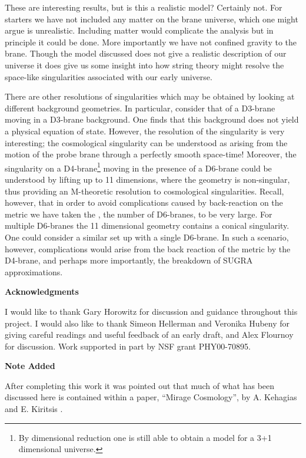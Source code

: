 \documentclass[a4paper,12pt]{article}
\begin{document}
These are interesting results, but is this a realistic model?
Certainly not.  For starters we have not included any matter on the
brane universe, which one might argue is unrealistic.  Including
matter would complicate the analysis but in
principle it could be done.  More importantly we have not confined
gravity to the brane.  Though the model discussed does not give a
realistic description of our
universe it does give us some insight into how string theory might
resolve the space-like singularities associated with our early universe.

There are other resolutions of singularities which may be obtained by looking at
different background geometries.
In particular, consider that of a D3-brane moving in a D3-brane background.
One finds that this background does not yield a physical equation
of state.  However, the resolution of the singularity is 
very interesting;   
the cosmological singularity can be understood as arising from the motion
of the probe brane through a perfectly smooth space-time!  
Moreover, the singularity on a D4-brane\footnote{By  dimensional
reduction one is still able to obtain a model for a 3+1 dimensional universe.}
moving in the presence of a D6-brane could be understood by lifting up to 11
dimensions, where the geometry is non-singular, thus providing an
M-theoretic resolution to cosmological
singularities.  Recall, however, that in order to avoid complications
caused by back-reaction on the metric we have taken the \coordHE{}, the number
of D6-branes, to be very large.  For multiple D6-branes the 11
dimensional geometry contains a
conical singularity.  One could consider a similar set up with a
single D6-brane.  In such a scenario, however, complications
would arise from the back reaction of the metric by the D4-brane,
and perhaps more importantly, the breakdown of SUGRA
approximations. 

\vskip 1.25cm \centerline{\bf Acknowledgments} \vskip 1cm

I would like to thank Gary Horowitz for discussion and guidance
throughout this project.  I would also like to thank Simeon Hellerman and
Veronika Hubeny for giving careful readings and useful feedback of an
early draft, and Alex Flournoy for discussion.
Work supported in part by NSF grant PHY00-70895.

\vskip 1.25cm \centerline{\bf \large Note Added \normalsize} 
\vskip 1cm

After completing this work it was pointed out that much of what has
been discussed here is contained within a paper, ``Mirage Cosmology'',
by A. Kehagias and E. Kiritsis \cite{mirage}.
\end{document}
